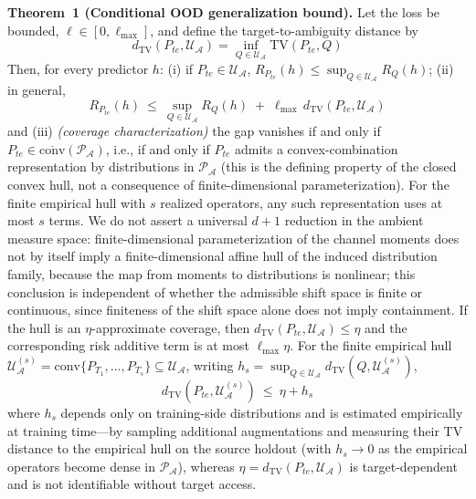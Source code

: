 \documentclass[electronics,article,submit,moreauthors]{Definitions/mdpi}
\newcommand{\add}[1]{\textcolor{addblue}{#1}}
\newcommand{\del}[1]{\textcolor{delred}{\st{#1}}}
\def\add#1{#1}%
\def\del#1{}%
\renewcommand{\add}[1]{#1}
\renewcommand{\del}[1]{}
\begin{document}
\noindent\textbf{Theorem~1 (Conditional OOD generalization bound).} Let the loss be bounded, $\ell\in[0,\ell_{\max}]$, and define the target-to-ambiguity distance by
\begin{equation}
d_{\mathrm{TV}}(P_{te},\mathcal{U}_{\mathcal{A}})=\inf_{Q\in\mathcal{U}_{\mathcal{A}}}\mathrm{TV}(P_{te},Q)
\end{equation}
Then, for every predictor $h$:
(i) if $P_{te}\in\mathcal{U}_{\mathcal{A}}$, $R_{P_{te}}(h)\leq\sup_{Q\in\mathcal{U}_{\mathcal{A}}}R_Q(h)$;
(ii) in general,
\begin{equation}
R_{P_{te}}(h)\ \leq\ \sup_{Q\in\mathcal{U}_{\mathcal{A}}}R_Q(h)\;+\;\ell_{\max}\,d_{\mathrm{TV}}(P_{te},\mathcal{U}_{\mathcal{A}})
\end{equation}
and (iii) \emph{(coverage characterization)} the gap vanishes if and only if $P_{te}\in\overline{\mathrm{conv}}(\mathcal{P}_{\mathcal{A}})$, i.e., \del{if and only if \mbox{$P_{te}$} is a convex combination of distributions in \mbox{$\mathcal{P}_{\mathcal{A}}$}, which by Carath\'eodory's theorem uses at most \mbox{$d+1$} terms in an affine hull of dimension \mbox{$d$}, where the affine-hull dimension \mbox{$d$} is finite because every \mbox{$P_T$} is indexed by the finite-dimensional channel-moment vector at the selected layers;}\add{if and only if $P_{te}$ admits a convex-combination representation by distributions in $\mathcal{P}_{\mathcal{A}}$ (this is the defining property of the closed convex hull, not a consequence of finite-dimensional parameterization). For the finite empirical hull with $s$ realized operators, any such representation uses at most $s$ terms. We do not assert a universal $d+1$ reduction in the ambient measure space: finite-dimensional parameterization of the channel moments does not by itself imply a finite-dimensional affine hull of the induced distribution family, because the map from moments to distributions is nonlinear;} this conclusion is independent of whether the admissible shift space is finite or continuous, since finiteness of the shift space alone does not imply containment. If the hull is an $\eta$-approximate coverage, then $d_{\mathrm{TV}}(P_{te},\mathcal{U}_{\mathcal{A}})\leq\eta$ and the corresponding risk additive term is at most $\ell_{\max}\eta$. For the finite empirical hull $\mathcal{U}_{\mathcal{A}}^{(s)}=\mathrm{conv}\{P_{T_1},\ldots,P_{T_s}\}\subseteq\mathcal{U}_{\mathcal{A}}$, writing $h_s=\sup_{Q\in\mathcal{U}_{\mathcal{A}}}d_{\mathrm{TV}}(Q,\mathcal{U}_{\mathcal{A}}^{(s)})$,
\begin{equation}
d_{\mathrm{TV}}(P_{te},\mathcal{U}_{\mathcal{A}}^{(s)})\ \leq\ \eta+h_s
\end{equation}
where $h_s$ \del{depends only on the training distribution and can be directly computed at training time}\add{depends only on training-side distributions and is estimated empirically at training time---by sampling additional augmentations and measuring their TV distance to the empirical hull on the source holdout} (with $h_s\to0$ as the empirical operators become dense in $\mathcal{P}_{\mathcal{A}}$), whereas $\eta=d_{\mathrm{TV}}(P_{te},\mathcal{U}_{\mathcal{A}})$ is target-dependent and is not identifiable without target access.
\end{document}

